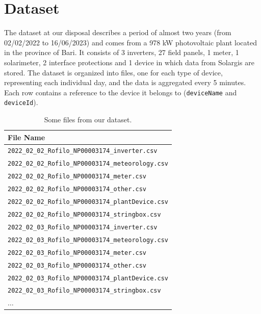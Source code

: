 \section{Dataset} \label{sec:dataset}

The dataset at our disposal describes a period of almost two years
(from 02/02/2022 to 16/06/2023) and comes from a 978 kW photovoltaic
plant located in the province of Bari. It consists of 3 inverters,
27 field panels, 1 meter, 1 solarimeter, 2 interface protections
and 1  device in which data from Solargis are stored.
The dataset is organized into files, one for each type of device,
representing each individual day, and the data is aggregated
every 5 minutes. Each row contains a reference to the device
it belongs to (\verb|deviceName| and \verb|deviceId|).



\begin{table}[H]
	\begin{center}
		\begin{tabular}[c]{l}
			\hline
			\textbf{File Name}                                  \\
			\hline
			\verb|2022_02_02_Rofilo_NP00003174_inverter.csv|    \\
			\verb|2022_02_02_Rofilo_NP00003174_meteorology.csv| \\
			\verb|2022_02_02_Rofilo_NP00003174_meter.csv|       \\
			\verb|2022_02_02_Rofilo_NP00003174_other.csv|       \\
			\verb|2022_02_02_Rofilo_NP00003174_plantDevice.csv| \\
			\verb|2022_02_02_Rofilo_NP00003174_stringbox.csv|   \\
			\verb|2022_02_03_Rofilo_NP00003174_inverter.csv|    \\
			\verb|2022_02_03_Rofilo_NP00003174_meteorology.csv| \\
			\verb|2022_02_03_Rofilo_NP00003174_meter.csv|       \\
			\verb|2022_02_03_Rofilo_NP00003174_other.csv|       \\
			\verb|2022_02_03_Rofilo_NP00003174_plantDevice.csv| \\
			\verb|2022_02_03_Rofilo_NP00003174_stringbox.csv|   \\
			$\ldots$                                            \\
			\hline
		\end{tabular}
	\end{center}
	\caption{Some files from our dataset.}\label{tab:datasunto}
\end{table}

